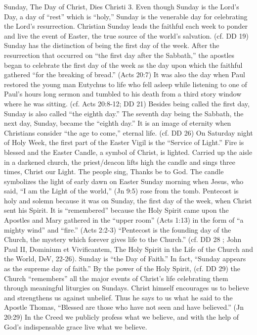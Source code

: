 \documentclass[oneside]{book}
\begin{document}
Sunday, The Day of Christ, Dies Christi
3. Even though Sunday is the Lord's Day, a day of ``rest'' which is ``holy,''
Sunday is the venerable day for celebrating the Lord's resurrection. Christian
Sunday leads the faithful each week to ponder and live the event of Easter, the
true source of the world's salvation. (cf. DD 19) Sunday has the distinction of
being the first day of the week. After the resurrection that occurred on ``the
first day after the Sabbath,'' the apostles began to celebrate the first day of
the week as the day upon which the faithful gathered ``for the breaking of
bread.'' (Acts 20:7) It was also the day when Paul restored the young man
Eutychus to life who fell asleep while listening to one of Paul's hours long
sermon and tumbled to his death from a third story window where he was
sitting. (cf. Acts 20:8-12; DD 21) Besides being called the first day, Sunday is
also called ``the eighth day.'' The seventh day being the Sabbath, the next day,
Sunday, became the ``eighth day.'' It is an image of eternity when Christians
consider ``the age to come,'' eternal life. (cf. DD 26)
On Saturday night of Holy Week, the first part of the Easter Vigil is the
``Service of Light.'' Fire is blessed and the Easter Candle, a symbol of Christ,
is lighted. Carried up the aisle in a darkened church, the priest/deacon lifts
high the candle and sings three times, Christ our Light. The people sing, Thanks
be to God. The candle symbolizes the light of early dawn on Easter Sunday
morning when Jesus, who said, ``I am the Light of the world,'' (Jn 9:5) rose
from the tomb.
Pentecost is holy and solemn because it was on Sunday, the first day of the
week, when Christ sent his Spirit. It is ``remembered'' because the Holy Spirit
came upon the Apostles and Mary gathered in the ``upper room'' (Acts 1:13) in
the form of ``a mighty wind'' and ``fire.'' (Acts 2:2-3) ``Pentecost is the
founding day of the Church, the mystery which forever gives life to the
Church.'' (cf. DD 28 ; John Paul II, Dominium et Vivificantem, The Holy Spirit
in the Life of the Church and the World, DeV, 22-26). Sunday is ``the Day of
Faith.'' In fact, ``Sunday appears as the supreme day of faith.'' By the power
of the Holy Spirit, (cf. DD 29) the Church ``remembers'' all the major events of
Christ's life celebrating them through meaningful liturgies on Sundays. Christ
himself encourages us to believe and strengthens us against unbelief. Thus he
says to us what he said to the Apostle Thomas, ``Blessed are those who have not
seen and have believed.'' (Jn 20:29) In the Creed we publicly profess what we
believe, and with the help of God's indispensable grace live what we believe.
\end{document}
